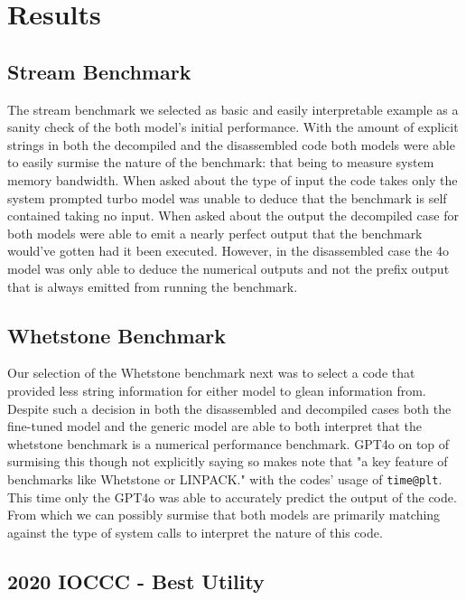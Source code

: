 \section{Results}
\subsection{Stream Benchmark}

The stream benchmark we selected as basic and easily interpretable example as a sanity check of the both model's initial performance. With the amount of explicit strings in both the decompiled and the disassembled code both models were able to easily surmise the nature of the benchmark: that being to measure system memory bandwidth. When asked about the type of input the code takes only the system prompted turbo model was unable to deduce that the benchmark is self contained taking no input. When asked about the output the decompiled case for both models were able to emit a nearly perfect output that the benchmark would've gotten had it been executed. However, in the disassembled case the 4o model was only able to deduce the numerical outputs and not the prefix output that is always emitted from running the benchmark.

\subsection{Whetstone Benchmark}

Our selection of the Whetstone benchmark next was to select a code that provided less string information for either model to glean information from. Despite such a decision in both the disassembled and decompiled cases both the fine-tuned model and the generic model are able to both interpret that the whetstone benchmark is a numerical performance benchmark. GPT4o on top of surmising this though not explicitly saying so makes note that "a key feature of benchmarks like Whetstone or LINPACK." with the codes' usage of \verb|time@plt|. This time only the GPT4o was able to accurately predict the output of the code. From which we can possibly surmise that both models are primarily matching against the type of system calls to interpret the nature of this code. 

\subsection{2020 IOCCC - Best Utility}

